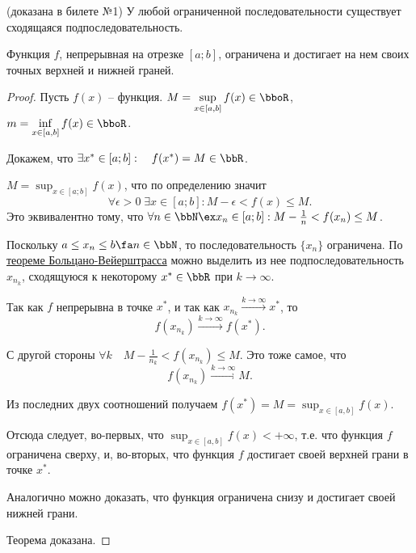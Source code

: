 \begin{thm}(доказана в билете №1)
У любой ограниченной последовательности существует сходящаяся подпоследовательность.
\end{thm}


\begin{thm} [Вейерштрасса] \label{ch1n1}
Функция $f$, непрерывная на отрезке $[a;b]$, ограничена и достигает на нем своих точных верхней и нижней граней.
\end{thm}
\begin{proof}\leavevmode

Пусть $f(x)$ -- функция. $M = \sup_{x \in [a,b]}\limits f(x) \in \bboR$, $m = \inf_{x \in [a,b]}\limits f(x) \in \bboR$.

Докажем, что $\exists x^* \in [a;b]:\quad f(x^*)= M \in \bbR$.
\smallskip

$M = \sup_{x \in [a;b]}\limits f(x)$, что по определению значит $$\forall \epsilon > 0\; \exists x\in [a;b]: M-\epsilon < f(x) \le M. $$ Это эквивалентно тому, что $\forall n \in \bbN \ex x_n \in [a;b]: M-\frac{1}{n} < f(x_n) \le M $.

Поскольку $ a\le x_n \le b \fa n \in \bbN$, то последовательность $\{x_n\}$ ограничена. По \hyperref[exp9]{теореме Больцано-Вейерштрасса} можно выделить из нее подпоследовательность ${x_{n_k}}$, сходящуюся к некоторому $x^* \in \bbR$ при $k \to \infty$.

Так как $f$ непрерывна в точке $x^*$, и так как $x_{n_k}\xrightarrow{k \to \infty} x^*$, то  
$$
f(x_{n_k}) \xrightarrow{k \to \infty} f(x^*).
$$ 

С другой стороны $\forall k \quad M-\frac{1}{n_k} < f(x_{n_k}) \le M$. Это тоже самое, что
$$
f(x_{n_k}) \xrightarrow{k \to \infty} M.
$$

Из последних двух соотношений получаем $f(x^*) = M = \sup_{x \in [a,b]}\limits f(x) $. 

Отсюда следует, во-первых, что  $\sup_{x \in [a,b]}\limits f(x)<+\infty$, т.е. что функция $f$ ограничена сверху, и, во-вторых, что функция $f$ достигает своей верхней грани в точке $x^*$.

Аналогично можно доказать, что функция ограничена снизу и достигает своей нижней грани.

Теорема доказана.   
\end{proof}